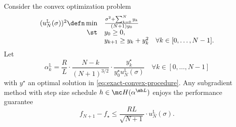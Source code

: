 \documentclass{article}
\begin{document}
\begin{proposition}\label{prop:u-L-bound}
  Consider the convex optimization problem
  \begin{equation}
    \label{eq:exact-convex-procedure}
    \begin{array}{rl}
      (u^{\mathbb L}_N(\sigma))^2 \defn \min  & \frac{\sigma^2 + \sum_{k=0}^{N} y_k }{(N+1)y_0}\\
                             \st & y_0\geq 0,\\
                                   & y_{k+1} \geq y_{k} + y_{k}^2 \quad \forall k\in [0, \dots, N-1].
    \end{array}
  \end{equation}
  Let
  \[
    \alpha^{\mathbb L}_k = \frac{R}{L}\cdot\frac{N-k}{(N+1)^{3/2}} \cdot \frac{y_k^\star }{y_0^\star u^{\mathbb L}_N(\sigma)} \quad \forall k\in [0, \dots, N-1]
  \]
  with $y^\star$ an optimal solution in \eqref{eq:exact-convex-procedure}.
  Any subgradient method with step size schedule $h\in \mc H(\alpha^{\mb L})$ enjoys the performance guarantee
  \[
  f_{N+1} - f_\star\leq \frac{RL}{\sqrt{N+1}}\cdot u^{\mathbb L}_N(\sigma).
  \]

\end{proposition}
\end{document}
